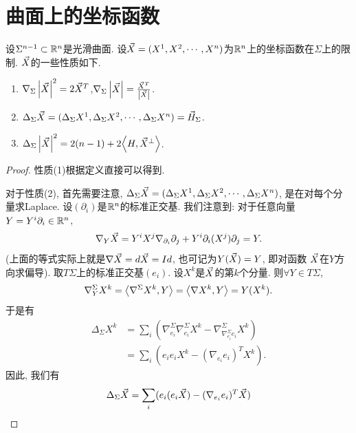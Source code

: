 \section{曲面上的坐标函数}
设$\Sigma^{n-1} \subset \mathbb{R}^n$是光滑曲面. 设${\vec{X}}=(X^1,X^2,\cdots,X^n)$为$\mathbb{R}^n$上的坐标函数在$\Sigma$上的限制. ${\vec{X}}$的一些性质如下.
\begin{enumerate}
    \item $\nabla_\Sigma \left | {\vec{X}} \right |^2=2{\vec{X}}^T$,$\nabla_\Sigma \left | {\vec{X}} \right |=\frac{{\vec{X}}^T}{\left | {\vec{X}} \right |}$.
    \item $\Delta_\Sigma {\vec{X}}=(\Delta_\Sigma X^1, \Delta_\Sigma X^2, \cdots, \Delta_\Sigma X^n)= \vec{H}_\Sigma$.
    \item $\Delta_\Sigma \left | {\vec{X}} \right |^2 = 2(n-1)+2{\left < H, {\vec{X}}^\perp \right >}$.%
\end{enumerate}
\begin{proof}
    性质(1)根据定义直接可以得到.
    \par 对于性质(2), 首先需要注意, $\Delta_\Sigma {\vec{X}}=(\Delta_\Sigma X^1, \Delta_\Sigma X^2, \cdots, \Delta_\Sigma X^n)$, 是在对每个分量求Laplace.  设$(\partial_i)$是$\mathbb{R}^n$的标准正交基. 我们注意到: 对于任意向量$Y=Y^i\partial_i \in \mathbb{R}^n$,
    \begin{equation}
        \nabla_Y{\vec{X}}=Y^iX^j\nabla_{\partial_i}\partial_j+Y^i\partial_i(X^j)\partial_j=Y. 
    \end{equation}
    (上面的等式实际上就是$\nabla {\vec{X}} =d{\vec{X}}= Id$, 也可记为$Y({\vec{X}})=Y$,  即对函数 ${\vec{X}}$在$Y$方向求偏导). 取$T\Sigma$上的标准正交基$(e_i)$. 设$X^k$是${\vec{X}}$的第$k$个分量. 则$\forall Y \in T\Sigma$, 
    \begin{equation}
        \nabla^\Sigma_Y X^k= {\left < \nabla^\Sigma X^k, Y \right >} = {\left < \nabla X^k, Y \right >} = Y(X^k). 
    \end{equation}
    于是有
    \begin{equation}
        \begin{split}
            \Delta_\Sigma X^k &= \sum_i (\nabla^\Sigma_{e_i}\nabla^\Sigma_{e_i} X^k -\nabla^\Sigma_{\nabla^\Sigma_{e_i}e_i} X^k) \\
            &= \sum_i(e_ie_i X^k - (\nabla_{e_i}e_i)^T X^k).
        \end{split}
    \end{equation}
    因此, 我们有
    \begin{equation}
        \begin{split}
            \Delta_\Sigma \XX  &= \sum_i(e_i(e_i \XX) - (\nabla_{e_i}e_i)^T \XX) \\

\end{split}
\end{equation}
\end{proof}
